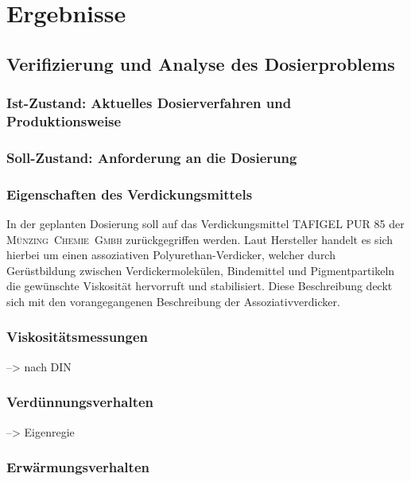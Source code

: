 \newpage
\section{Ergebnisse}
\label{sec:ergebnisse}

\subsection{Verifizierung und Analyse des Dosierproblems}
\subsubsection{Ist-Zustand: Aktuelles Dosierverfahren und Produktionsweise}

\subsubsection{Soll-Zustand: Anforderung an die Dosierung}
%
\subsubsection{Eigenschaften des Verdickungsmittels}
In der geplanten Dosierung soll auf das Verdickungsmittel TAFIGEL PUR 85 der \mbox{\textsc{Münzing Chemie Gmbh}} zurückgegriffen werden. Laut Hersteller handelt es sich hierbei um einen assoziativen Polyurethan-Verdicker, welcher durch Gerüstbildung zwischen Verdickermolekülen, Bindemittel und Pigmentpartikeln die gewünschte Viskosität hervorruft und stabilisiert. Diese Beschreibung deckt sich mit den vorangegangenen Beschreibung der Assoziativverdicker.\cite{MunzingChemieGmbH.2014}\\

\subsubsection{Viskositätsmessungen}
--> nach DIN

\subsubsection{Verdünnungsverhalten}
--> Eigenregie

\subsubsection{Erwärmungsverhalten}

